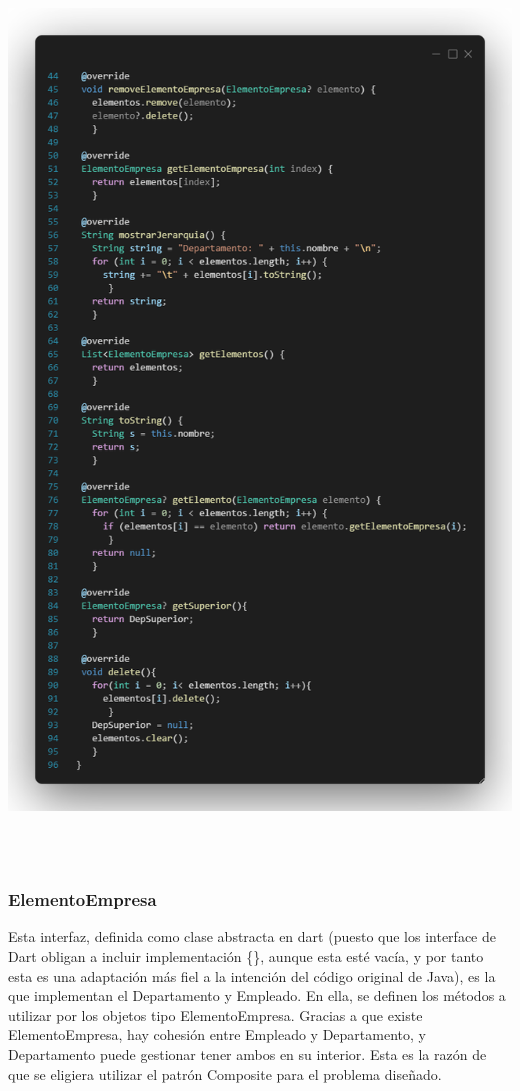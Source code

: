 \documentclass[
]{article}
\begin{document}
\includegraphics[width=5.90522in,height=9.40278in]{imagenes/Departamento2.png}

\subsubsection{ElementoEmpresa}\label{elementoempresa}

Esta interfaz, definida como clase abstracta en dart (puesto que los
interface de Dart obligan a incluir implementación \{\}, aunque esta
esté vacía, y por tanto esta es una adaptación más fiel a la intención
del código original de Java), es la que implementan el Departamento y
Empleado. En ella, se definen los métodos a utilizar por los objetos
tipo ElementoEmpresa. Gracias a que existe ElementoEmpresa, hay cohesión
entre Empleado y Departamento, y Departamento puede gestionar tener
ambos en su interior. Esta es la razón de que se eligiera utilizar el
patrón Composite para el problema diseñado.
\end{document}
